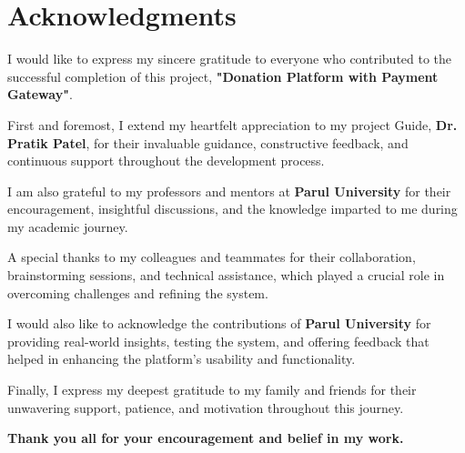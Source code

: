 \chapter*{Acknowledgments}


I would like to express my sincere gratitude to everyone who contributed to the successful completion of this project, \textbf{"Donation Platform with Payment Gateway"}. 

First and foremost, I extend my heartfelt appreciation to my project Guide, \textbf{Dr. Pratik Patel}, for their invaluable guidance, constructive feedback, and continuous support throughout the development process.

I am also grateful to my professors and mentors at \textbf{Parul University} for their encouragement, insightful discussions, and the knowledge imparted to me during my academic journey.

A special thanks to my colleagues and teammates for their collaboration, brainstorming sessions, and technical assistance, which played a crucial role in overcoming challenges and refining the system.

I would also like to acknowledge the contributions of \textbf{Parul University} for providing real-world insights, testing the system, and offering feedback that helped in enhancing the platform's usability and functionality.

Finally, I express my deepest gratitude to my family and friends for their unwavering support, patience, and motivation throughout this journey.

\bigskip

\textbf{Thank you all for your encouragement and belief in my work.}
